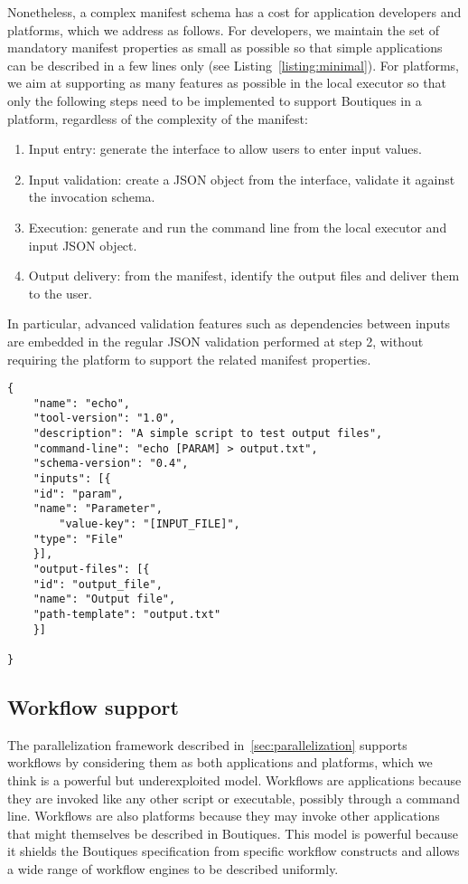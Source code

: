 \documentclass{article}
\newcommand{\boutiques}{Boutiques\xspace}
\begin{document}
Nonetheless, a complex manifest schema has a cost for application
developers and platforms, which we address as follows. For developers,
we maintain the set of mandatory manifest properties as small as
possible so that simple applications can be described in a few lines
only (see Listing~\ref{listing:minimal}). For platforms, we aim at
supporting as many features as possible in the local executor so that
only the following steps need to be implemented to support \boutiques
in a platform, regardless of the complexity of the manifest:
\begin{enumerate}
  \item Input entry: generate the interface to allow users to enter
    input values.
  \item Input validation: create a JSON object from the interface,
    validate it against the invocation schema.
  \item Execution: generate and run the command line from the local
    executor and input JSON object.
  \item Output delivery: from the manifest, identify the output files
    and deliver them to the user.
\end{enumerate}
In particular, advanced validation features such as dependencies
between inputs are embedded in the regular JSON validation performed
at step 2, without requiring the platform to support the related
manifest properties.
\begin{listing}
\begin{verbatim}
{
    "name": "echo",
    "tool-version": "1.0",
    "description": "A simple script to test output files",
    "command-line": "echo [PARAM] > output.txt",
    "schema-version": "0.4",
    "inputs": [{
	"id": "param",
	"name": "Parameter",
        "value-key": "[INPUT_FILE]",
	"type": "File"
    }],
    "output-files": [{
	"id": "output_file",
	"name": "Output file",
	"path-template": "output.txt"
    }]

}
\end{verbatim}
\caption{A minimal \boutiques manifest.} 
\label{listing:minimal}
\end{listing}

\subsection{Workflow support}

The parallelization framework described in~\ref{sec:parallelization}
supports workflows by considering them as both applications and
platforms, which we think is a powerful but underexploited
model. Workflows are applications because they are invoked like any
other script or executable, possibly through a command line. Workflows
are also platforms because they may invoke other applications that
might themselves be described in \boutiques. This model is powerful
because it shields the \boutiques specification from specific workflow
constructs and allows a wide range of workflow engines to be described
uniformly. 
  
\end{document}
